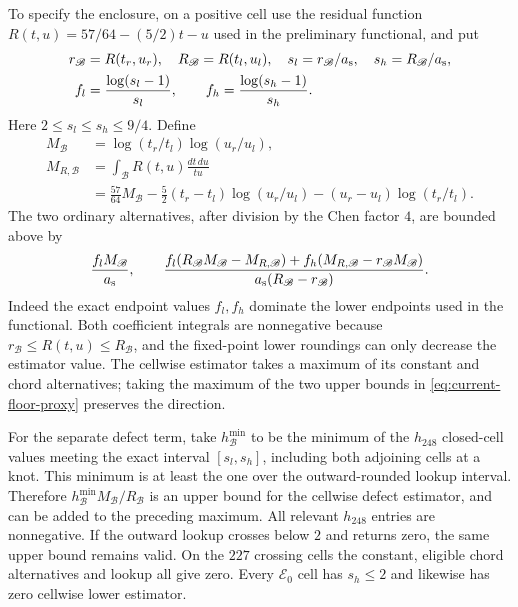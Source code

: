 To specify the enclosure, on a positive cell use the residual
function $R(t,u)=57/64-(5/2)t-u$ used in the preliminary functional,
and put
\begin{align*}
 r_{\mathscr B}&=R(t_r,u_r),\quad R_{\mathscr B}=R(t_l,u_l),\quad
 s_l=r_{\mathscr B}/{a_{\rm s}},\quad s_h=R_{\mathscr B}/{a_{\rm s}},\\
 f_l&=\frac{\log(s_l-1)}{s_l},\qquad
 f_h=\frac{\log(s_h-1)}{s_h}.
\end{align*}
Here $2\le s_l\le s_h\le9/4$.  Define
\begin{align*}
 M_{\mathscr B}&=\log(t_r/t_l)\log(u_r/u_l),\\
 M_{R,\mathscr B}
 &=\int_{\mathscr B} R(t,u)\frac{dt\,du}{tu}\\
 &=\frac{57}{64}M_{\mathscr B}
   -\frac52(t_r-t_l)\log(u_r/u_l)
   -(u_r-u_l)\log(t_r/t_l).
\end{align*}
The two ordinary alternatives, after division by the Chen
factor $4$, are bounded above by
\begin{equation}
 \frac{f_lM_{\mathscr B}}{{a_{\rm s}}},
 \qquad
 \frac{f_l(R_{\mathscr B}M_{\mathscr B}-M_{R,\mathscr B})+
       f_h(M_{R,\mathscr B}-r_{\mathscr B}M_{\mathscr B})}{a_{\rm s}(R_{\mathscr B}-r_{\mathscr B})}.
 \label{eq:current-floor-proxy}
\end{equation}
Indeed the exact endpoint values $f_l,f_h$ dominate the
lower endpoints used in the functional.  Both coefficient integrals are
nonnegative because $r_{\mathscr B}\le R(t,u)\le R_{\mathscr B}$, and the fixed-point lower roundings can only decrease the estimator value.
The cellwise estimator takes a maximum of its constant and
chord alternatives; taking the maximum of the two upper bounds
in \eqref{eq:current-floor-proxy} preserves the direction.

For the separate defect term, take $h_{\mathscr B}^{\min}$ to be the minimum of
the $h_{248}$ closed-cell values meeting the exact interval
$[s_l,s_h]$, including both adjoining cells at a knot.  This
minimum is at least the one over the outward-rounded lookup
interval.  Therefore $h_{\mathscr B}^{\min}M_{\mathscr B}/R_{\mathscr B}$ is an upper bound for the
cellwise defect estimator, and can be added to the preceding maximum.
All relevant $h_{248}$ entries are nonnegative.  If the outward lookup crosses below $2$ and returns zero, the same
upper bound remains valid.  On the $227$ crossing cells the
constant, eligible chord alternatives and lookup all give zero.
Every $\mathscr E_0$ cell has $s_h\le2$ and likewise has zero cellwise lower estimator.

